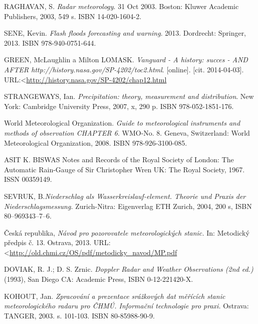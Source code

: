 \documentclass[a4paper,12pt]{article}
\renewcommand\baselinestretch{1.3}
\begin{document}
\newpage
\renewcommand\baselinestretch{1.2}
\selectfont
\renewcommand{\refname}{Použité zdroje}
\addcontentsline{toc}{section}{\refname}

\begin{thebibliography}{99}
\label{literatura}




RAGHAVAN, S. \textit {Radar meteorology}.
31 Oct 2003. Boston: Kluwer Academic Publishers, 2003, 549 s. ISBN 14-020-1604-2. 

SENE, Kevin. \textit {Flash floods forecasting and warning}.
2013. Dordrecht: Springer, 2013. ISBN 978-940-0751-644. 

GREEN, McLaughlin a Milton LOMASK. \textit {Vanguard - A history: succes - AND AFTER http://history.nasa.gov/SP-4202/toc2.html}.
[online]. [cit. 2014-04-03]. URL:\textless\url {http://history.nasa.gov/SP-4202/chap12.html}

STRANGEWAYS, Ian.  \textit {Precipitation: theory, measurement and distribution}.
New York: Cambridge University Press, 2007, x, 290 p. ISBN 978-052-1851-176. 

World Meteorological Organization. \textit{Guide to meteorological instruments and methods of observation CHAPTER 6}. WMO-No. 8. Geneva, Switzerland: World Meteorological Organization, 2008. ISBN 978-926-3100-085. 

ASIT K. BISWAS {Notes and Records of the Royal Society of London: The Automatic Rain-Gauge of Sir Christopher Wren} UK: The Royal Society, 1967. ISSN 00359149. 

SEVRUK, B.\textit{Niederschlag als Wasserkreislauf-element. Theorie und Praxis der Niederschlagsmessung.} 
Zurich-Nitra: Eigenverlag ETH Zurich,  2004, 200 s, ISBN 80–969343–7–6.

Česká republika, \textit{Návod pro pozorovatele meteorologických stanic.}
In: Metodický předpis č. 13. Ostrava, 2013. URL:\textless\url {http://old.chmi.cz/OS/pdf/metodicky_navod/MP.pdf}


DOVIAK, R. J.; D. S. Zrnic. \textit{Doppler Radar and Weather Observations (2nd ed.)}
(1993), San Diego CA: Academic Press, ISBN 0-12-221420-X.

KOHOUT, Jan. \textit{Zpracování a prezentace srážkových dat měřících stanic meteorologického radaru pro ČHMÚ. Informační technologie pro praxi.}
Ostrava: TANGER, 2003. s. 101-103. ISBN 80-85988-90-9.


\end{thebibliography}
\end{document}
